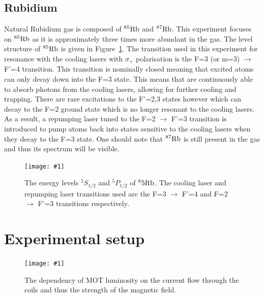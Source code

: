 \documentclass[twocolumn]{article}
\newcommand{\insertFigure}[1]{%
   \texttt{[image: \#1]}%
}
\begin{document}
\subsection{Rubidium} \label{sec:Rubidium}
Natural Rubidium gas is composed of $^{85}\ce{Rb}$ and $^{87}\ce{Rb}$. This experiment focuses on $^{85}\ce{Rb}$ as it is approximately three times more abundant in the gas. The level structure of $^{85}\ce{Rb}$ is given in Figure~\ref{fig:Spectrum}. The transition used in this experiment for resonance with the cooling lasers with $\sigma_+$ polarisation is the F=3 (or m=3) $\to$ F'=4 transition. This transition is nominally closed meaning that excited atoms can only decay down into the F=3 state. This means that are continuously able to absorb photons from the cooling lasers, allowing for further cooling and trapping. There are rare excitations to the F'=2,3 states however which can decay to the F=2 ground state which is no longer resonant to the cooling lasers. As a result, a repumping laser tuned to the F=2 $\to$ F'=3 transition is introduced to pump atoms back into states sensitive to the cooling lasers when they decay to the F=3 state. One should note that $^{87}\ce{Rb}$ is still present in the gas and thus its spectrum will be visible.
\begin{figure} [!h]
	\centering
	\insertFigure{Images/Spectrum.png}
	\caption{The energy levels $^5S_{1/2}$ and $^5P_{1/2}$ of $^85\ce{Rb}$. The cooling laser and repumping laser transitions used are the F=3 $\to$ F'=4 and F=2 $\to$ F'=3 transitions respectively.~\cite{Wieman}}
	\label{fig:Spectrum}
\end{figure}

\section{Experimental setup} \label{sec:Exp}
\begin{figure} [!h]
	\centering
	\insertFigure{Images/Laser.png}
	\caption{The dependency of MOT luminosity on the current flow through the coils and thus the strength of the magnetic field.\cite{manual}}
	\label{fig:Laser}
\end{figure}
\end{document}
